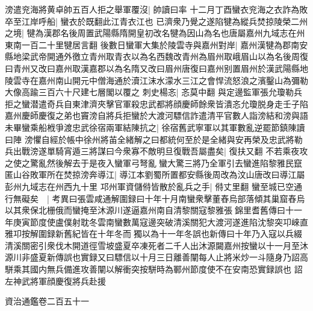 滂遣兖海將黄卓帥五百人拒之舉軍覆沒|{
	帥讀曰率}
十二月丁酉蠻衣兖海之衣詐為敗卒至江岸呼船|{
	蠻衣於既翻此江青衣江也}
已濟衆乃覺之遂陷犍為縱兵焚掠陵榮二州之境|{
	犍為漢郡名後周置武陽縣隋開皇初改名犍為因山為名也唐屬嘉州九域志在州東南一百二十里犍居言翻}
後數日蠻軍大集於陵雲寺與嘉州對岸|{
	嘉州漢犍為郡南安縣地梁武帝開通外徼立青州取青衣以為名西魏改青州為眉州取峨眉山以為名後周復曰青州又改曰嘉州取漢嘉郡以為名隋又改曰眉州唐復曰嘉州别置眉州於漢武陽縣地陵雲寺在嘉州南山開元中僧海通於瀆江沫水濛水三江之會悍流怒浪之濱鑿山為彌勒大像高踰三百六十尺建七層閣以覆之}
刺史楊忞|{
	忞莫中翻}
與定邊監軍張允瓊勒兵拒之蠻潜遣奇兵自東津濟夾擊官軍殺忠武都將顔慶師餘衆皆潰忞允瓊脱身走壬子陷嘉州慶師慶復之弟也竇滂自將兵拒蠻於大渡河驃信詐遣清平官數人詣滂結和滂與語未畢蠻乘船栰爭渡忠武徐宿兩軍結陳抗之|{
	徐宿舊武寧軍以其軍數亂逆罷節鎮陳讀曰陣}
滂懼自經於帳中徐州將苖全緒解之曰都統何至於是全緒與安再榮及忠武將勒兵出戰滂遂單騎宵遁三將謀曰今衆寡不敵明旦復戰吾屬盡矣|{
	復扶又翻}
不若乘夜攻之使之驚亂然後解去于是夜入蠻軍弓弩亂蠻大驚三將乃全軍引去蠻進陷黎雅民竄匿山谷敗軍所在焚掠滂奔導江|{
	導江本劉蜀所置都安縣後周改為汶山唐改曰導江屬彭州九域志在州西九十里}
邛州軍資儲偫皆散於亂兵之手|{
	偫丈里翻}
蠻至城已空通行無礙矣　|{
	考異曰張雲咸通解圍録曰十年十月南蠻衆擊董舂烏部落傾其巢窟舂烏以其衆保北栅俄而蠻掩至沐源川遂逼嘉州南自清黎關寇黎雅張錦里耆舊傳曰十一年庚寅節度使盧僕射耽冬雲南蠻數萬寇邊突破清溪關犯大渡河遂進陷沈黎突卭崍直雅卭按解圍録新舊紀皆在十年冬而獨以為十一年冬誤也新傳曰十年乃入寇以兵綴清溪關密引衆伐木開道徑雪坡盛夏卒凍死者二千人出沐源闚嘉州按蠻以十一月至沐源川非盛夏新傳誤也實録又曰驃信以十月三日離善闡每人止將米炒一斗隨身乃詔高駢乘其國内無兵備進攻善闡以解衝突按駢時為鄆州節度使不在安南恐實録誤也}
詔左神武將軍顔慶復將兵赴援

資治通鑑卷二百五十一

